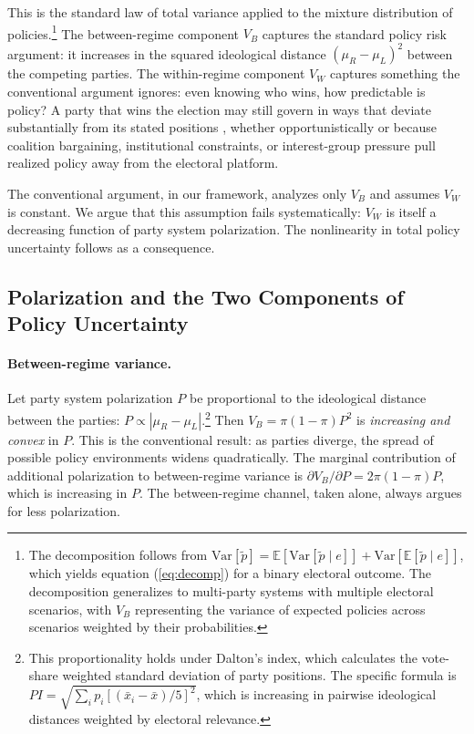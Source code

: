 \documentclass[12pt]{article}
\begin{document}
\noindent This is the standard law of total variance applied to the mixture
distribution of policies.\footnote{The decomposition follows from
$\text{Var}[\tilde{p}] = \mathbb{E}[\text{Var}[\tilde{p}\mid e]] +
\text{Var}[\mathbb{E}[\tilde{p}\mid e]]$, which yields equation
(\ref{eq:decomp}) for a binary electoral outcome. The decomposition
generalizes to multi-party systems with multiple electoral scenarios, with
$V_B$ representing the variance of expected policies across scenarios weighted
by their probabilities.} The between-regime component $V_B$ captures the
standard policy risk argument: it increases in the squared ideological
distance $(\mu_R - \mu_L)^2$ between the competing parties. The within-regime
component $V_W$ captures something the conventional argument ignores: even
knowing who wins, how predictable is policy? A party that wins the election
may still govern in ways that deviate substantially from its stated positions
, whether opportunistically or because coalition bargaining, institutional
constraints, or interest-group pressure pull realized policy away from the
electoral platform.

The conventional argument, in our framework, analyzes only $V_B$ and assumes
$V_W$ is constant. We argue that this assumption fails systematically:
$V_W$ is itself a decreasing function of party system polarization. The
nonlinearity in total policy uncertainty follows as a consequence.

\subsection{Polarization and the Two Components of Policy Uncertainty}

\paragraph{Between-regime variance.} Let party system polarization $P$
be proportional to the ideological distance between the parties:
$P \propto |\mu_R - \mu_L|$.\footnote{This proportionality holds under
Dalton's \citeyearpar{Dalton2008} index, which calculates the
vote-share weighted standard deviation of party positions. The specific
formula is $PI = \sqrt{\sum_i p_i [(\bar{x}_i - \bar{x})/5]^2}$, which
is increasing in pairwise ideological distances weighted by electoral
relevance.} Then $V_B = \pi(1-\pi)P^2$ is \textit{increasing and convex}
in $P$. This is the conventional result: as parties diverge, the
spread of possible policy environments widens quadratically. The marginal
contribution of additional polarization to between-regime variance is
$\partial V_B / \partial P = 2\pi(1-\pi)P$, which is increasing in $P$.
The between-regime channel, taken alone, always argues for less polarization.
\end{document}
